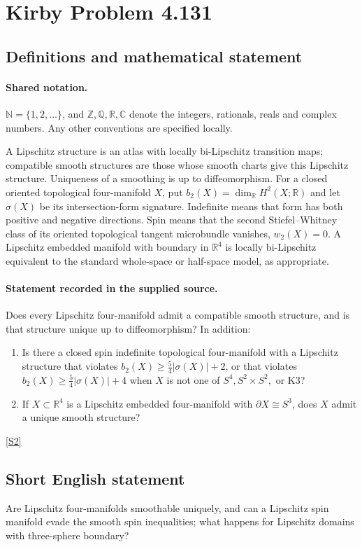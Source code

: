 \documentclass[11pt]{article}
\newcommand{\sref}[2]{\hyperlink{source:#1:#2}{[S#2]}}
\begin{document}
\section{Kirby Problem 4.131}\label{statement}

\subsection{Definitions and mathematical statement}

\paragraph{Shared notation.}$\mathbb N=\{1,2,\ldots\}$, and $\mathbb Z,\mathbb Q,\mathbb R,\mathbb C$ denote the integers, rationals, reals and complex numbers. Any other conventions are specified locally.


A Lipschitz structure is an atlas with locally bi-Lipschitz transition maps; compatible smooth structures are those whose smooth charts give this Lipschitz structure. Uniqueness of a smoothing is up to diffeomorphism. For a closed oriented topological four-manifold $X$, put $b_2(X)=\dim_{\mathbb R}H^2(X;\mathbb R)$ and let $\sigma(X)$ be its intersection-form signature. Indefinite means that form has both positive and negative directions. Spin means that the second Stiefel--Whitney class of its oriented topological tangent microbundle vanishes, $w_2(X)=0$. A Lipschitz embedded manifold with boundary in $\mathbb R^4$ is locally bi-Lipschitz equivalent to the standard whole-space or half-space model, as appropriate.
\paragraph{Statement recorded in the supplied source.}
Does every Lipschitz four-manifold admit a compatible smooth structure, and is that structure unique up to diffeomorphism? In addition:
\begin{enumerate}
\item[(a)] Is there a closed spin indefinite topological four-manifold with a Lipschitz structure that violates
$b_2(X)\geq\tfrac54|\sigma(X)|+2$, or that violates
$b_2(X)\geq\tfrac54|\sigma(X)|+4$ when $X$ is not one of $S^4,S^2\times S^2,$ or K3?
\item[(b)] If $X\subset\mathbb R^4$ is a Lipschitz embedded four-manifold with $\partial X\cong S^3$, does $X$ admit a unique smooth structure?
\end{enumerate} \sref{statement}{2}
\subsection{Short English statement}
Are Lipschitz four-manifolds smoothable uniquely, and can a Lipschitz spin manifold evade the smooth spin inequalities; what happens for Lipschitz domains with three-sphere boundary?
\end{document}
